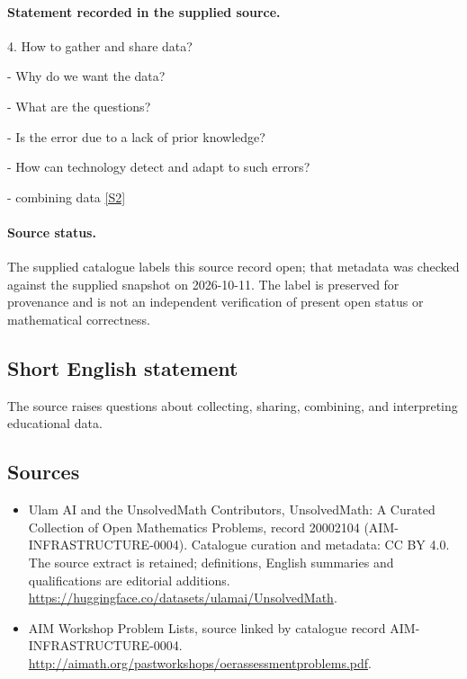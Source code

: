 \documentclass[11pt]{article}
\begin{document}
\paragraph{Statement recorded in the supplied source.}
4. How to gather and share data?

- Why do we want the data?

- What are the questions?

- Is the error due to a lack of prior knowledge?

- How can technology detect and adapt to such errors?

- combining data \href{http://aimath.org/pastworkshops/oerassessmentproblems.pdf}{[S2]}
\paragraph{Source status.}
The supplied catalogue labels this source record open; that metadata was checked against the supplied snapshot on 2026-10-11. The label is preserved for provenance and is not an independent verification of present open status or mathematical correctness.
\subsection{Short English statement}
The source raises questions about collecting, sharing, combining, and interpreting educational data.
\subsection{Sources}
\begin{itemize}
\item[S1] Ulam AI and the UnsolvedMath Contributors, UnsolvedMath: A Curated Collection of Open Mathematics Problems, record 20002104 (AIM-INFRASTRUCTURE-0004). Catalogue curation and metadata: CC BY 4.0. The source extract is retained; definitions, English summaries and qualifications are editorial additions.
\url{https://huggingface.co/datasets/ulamai/UnsolvedMath}.
\item[S2] AIM Workshop Problem Lists, source linked by catalogue record AIM-INFRASTRUCTURE-0004.
\url{http://aimath.org/pastworkshops/oerassessmentproblems.pdf}.
\end{itemize}
\end{document}
